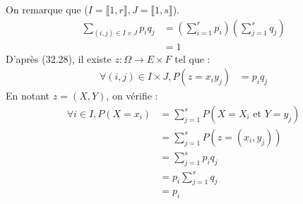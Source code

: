 \documentclass[../main.tex]{subfiles}
\begin{document}
\noindent On remarque que ($I = \llbracket 1, r \rrbracket, J = \llbracket 1, s \rrbracket$). 
\begin{align*}
    \sum_{(i, j) \in I \times J} p_i q_j &= \left( \sum_{i=1}^{r} p_i \right) \left( \sum_{j=1}^{s} q_j \right) \\
    &= 1
\end{align*}
D'après (32.28), il existe $z:\Omega\to E\times F$ tel que : 
\begin{align*}
    \forall (i, j) \in I \times J, P(z = x_i y_j) &= p_i q_j
\end{align*}
En notant $z = (X, Y)$, on vérifie : 
\begin{align*}
    \forall i\in I, P(X = x_i) &= \sum_{j=1}^{s} P(X = X_i \text{ et } Y = y_j) \\
    &= \sum_{j=1}^{s} P(z = (x_i, y_j)) \\
    &= \sum_{j=1}^{s} p_i q_j \\
    &= p_i \sum_{j=1}^{s} q_j \\
    &= p_i
\end{align*}
\end{document}

